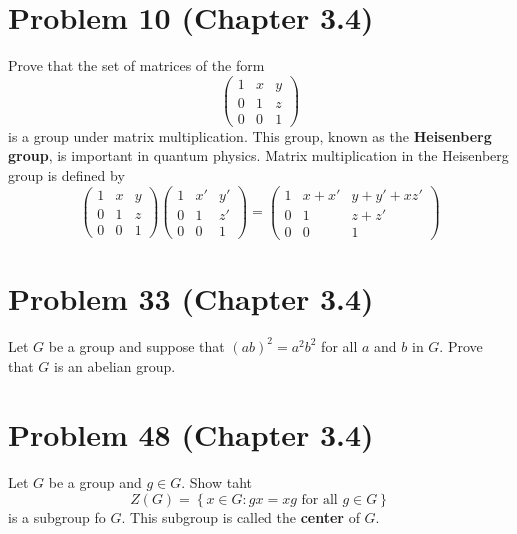 \documentclass[cm, 10pt]{article}
\newcommand{\set}[1]{\ensuremath{ \left\{ #1 \right\} }}
\begin{document}
    \section*{Problem 10 (Chapter 3.4)}
      Prove that the set of matrices of the form
      \[
        \begin{pmatrix}
          1 & x & y \\
          0 & 1 & z \\
          0 & 0 & 1
        \end{pmatrix}
      \]
      is a group under matrix multiplication. This group, known as the
      \textbf{Heisenberg group}, is important in quantum physics.
      Matrix multiplication in the Heisenberg group is defined by
      \[
        \begin{pmatrix}
          1 & x & y \\
          0 & 1 & z \\
          0 & 0 & 1
        \end{pmatrix}
        \begin{pmatrix}
          1 & x' & y' \\
          0 & 1 & z' \\
          0 & 0 & 1
        \end{pmatrix}
        =
        \begin{pmatrix}
          1 & x + x' & y + y' + xz' \\
          0 & 1 & z + z' \\
          0 & 0 & 1
        \end{pmatrix}
      \]

    \hrulefill %

    \clearpage


    \section*{Problem 33 (Chapter 3.4)}
      Let $G$ be a group and suppose that $(ab)^2 = a^2b^2$ for all
      $a$ and $b$ in $G$. Prove that $G$ is an abelian group.

    \hrulefill %

    \clearpage


    \section*{Problem 48 (Chapter 3.4)}
      Let $G$ be a group and $g \in G$. Show taht
      \[
        Z(G) = \set{x \in G : gx = xg \text{ for all } g \in G}
      \]
      is a subgroup fo $G$. This subgroup is called the
      \textbf{center} of $G$.
\end{document}
